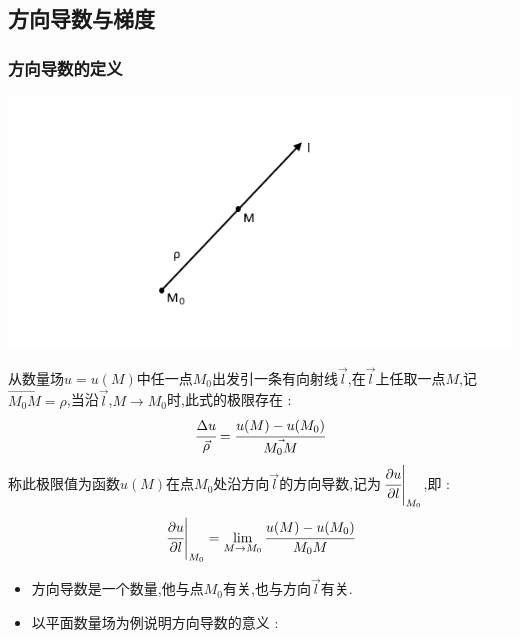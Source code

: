 \documentclass[UTF8,12pt]{ctexbook}
\newcommand{\limNormal}[1]{\lim\limits_{#1}}
\newcommand{\directionDerivative}[3]{\left.\cfrac{\partial #1}{\partial #2}\right|_{#3}}
\begin{document}
{{{{  }%

  \subsection{方向导数与梯度}{

    \subsubsection{方向导数的定义}{
      \includegraphics{resources/directionDerivative1.png}

      从数量场$u= u(M)$中任一点$M_0$出发引一条有向射线$\vec{l}$,在$\vec{l}$上任取一点$M$,记$\vec{M_0M} = \rho$,当沿$\vec{l}$,$M \to M_0$时,此式的极限存在 :
      $$
        \cfrac{\Delta u}{\vec{\rho}} = \cfrac{u(M) - u(M_0)}{\vec{M_0M}}
      $$
      称此极限值为函数$u(M)$在点$M_0$处沿方向$\vec{l}$的方向导数,记为$\directionDerivative{u}{l}{M_0}$,即 :
      $$
        \directionDerivative{u}{l}{M_0} = \limNormal{M \to M_0}\cfrac{u(M) - u(M_0)}{M_0M}
      $$

      \begin{itemize}
        \item 方向导数是一个数量,他与点$M_0$有关,也与方向$\vec{l}$有关.
        \item {
              以平面数量场为例说明方向导数的意义 :

}
\end{itemize}}}}}}
\end{document}
